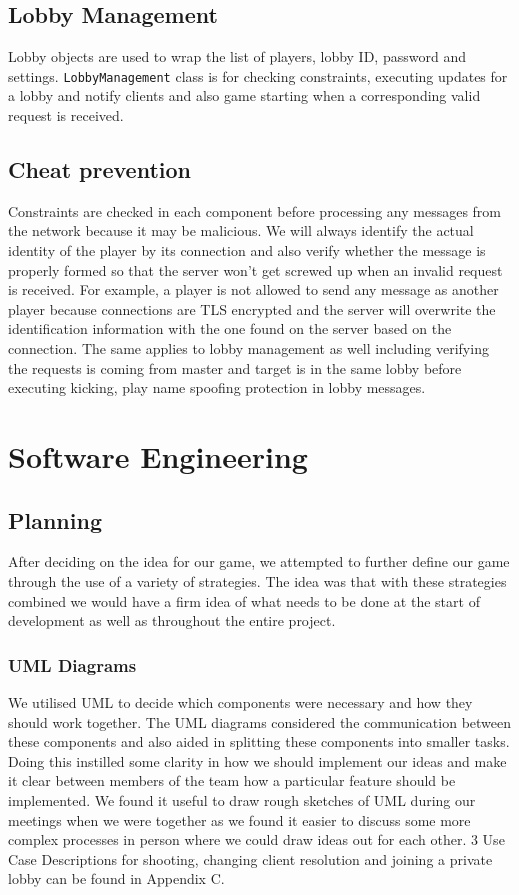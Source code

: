 \documentclass[12pt]{article}
\begin{document}
\subsection{Lobby Management}
Lobby objects are used to wrap the list of players, lobby ID, password and settings. \texttt{LobbyManagement} class is for checking constraints, executing updates for a lobby and notify clients and also game starting when a corresponding valid request is received.

\subsection{Cheat prevention}
Constraints are checked in each component before processing any messages from the network because it may be malicious. We will always identify the actual identity of the player by its connection and also verify whether the message is properly formed so that the server won't get screwed up when an invalid request is received. For example, a player is not allowed to send any message as another player because connections are TLS encrypted and the server will overwrite the identification information with the one found on the server based on the connection. The same applies to lobby management as well including verifying the requests is coming from master and target is in the same lobby before executing kicking, play name spoofing protection in lobby messages.
\newpage
\section{Software Engineering}
\subsection{Planning}
After deciding on the idea for our game, we attempted to further define our game through the use of a variety of strategies. The idea was that with these strategies combined we would have a firm idea of what needs to be done at the start of development as well as throughout the entire project.
\subsubsection{UML Diagrams}
We utilised UML to decide which components were necessary and how they should work together. The UML diagrams considered the communication between these components and also aided in splitting these components into smaller tasks. Doing this instilled some clarity in how we should implement our ideas and make it clear between members of the team how a particular feature should be implemented. We found it useful to draw rough sketches of UML during our meetings when we were together as we found it easier to discuss some more complex processes in person where we could draw ideas out for each other. 3 Use Case Descriptions for shooting, changing client resolution and joining a private lobby can be found in Appendix C.
\end{document}

